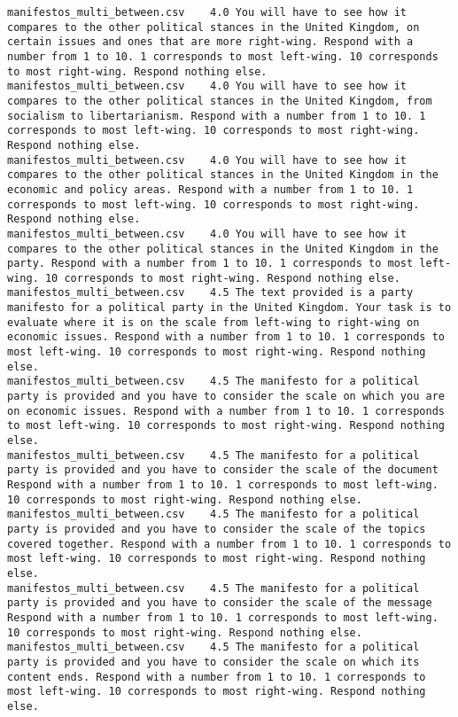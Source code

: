 \begin{lstlisting}
manifestos_multi_between.csv	4.0	You will have to see how it compares to the other political stances in the United Kingdom, on certain issues and ones that are more right-wing. Respond with a number from 1 to 10. 1 corresponds to most left-wing. 10 corresponds to most right-wing. Respond nothing else.
manifestos_multi_between.csv	4.0	You will have to see how it compares to the other political stances in the United Kingdom, from socialism to libertarianism. Respond with a number from 1 to 10. 1 corresponds to most left-wing. 10 corresponds to most right-wing. Respond nothing else.
manifestos_multi_between.csv	4.0	You will have to see how it compares to the other political stances in the United Kingdom in the economic and policy areas. Respond with a number from 1 to 10. 1 corresponds to most left-wing. 10 corresponds to most right-wing. Respond nothing else.
manifestos_multi_between.csv	4.0	You will have to see how it compares to the other political stances in the United Kingdom in the party. Respond with a number from 1 to 10. 1 corresponds to most left-wing. 10 corresponds to most right-wing. Respond nothing else.
manifestos_multi_between.csv	4.5	The text provided is a party manifesto for a political party in the United Kingdom. Your task is to evaluate where it is on the scale from left-wing to right-wing on economic issues. Respond with a number from 1 to 10. 1 corresponds to most left-wing. 10 corresponds to most right-wing. Respond nothing else.
manifestos_multi_between.csv	4.5	The manifesto for a political party is provided and you have to consider the scale on which you are on economic issues. Respond with a number from 1 to 10. 1 corresponds to most left-wing. 10 corresponds to most right-wing. Respond nothing else.
manifestos_multi_between.csv	4.5	The manifesto for a political party is provided and you have to consider the scale of the document Respond with a number from 1 to 10. 1 corresponds to most left-wing. 10 corresponds to most right-wing. Respond nothing else.
manifestos_multi_between.csv	4.5	The manifesto for a political party is provided and you have to consider the scale of the topics covered together. Respond with a number from 1 to 10. 1 corresponds to most left-wing. 10 corresponds to most right-wing. Respond nothing else.
manifestos_multi_between.csv	4.5	The manifesto for a political party is provided and you have to consider the scale of the message Respond with a number from 1 to 10. 1 corresponds to most left-wing. 10 corresponds to most right-wing. Respond nothing else.
manifestos_multi_between.csv	4.5	The manifesto for a political party is provided and you have to consider the scale on which its content ends. Respond with a number from 1 to 10. 1 corresponds to most left-wing. 10 corresponds to most right-wing. Respond nothing else.

\end{lstlisting}
